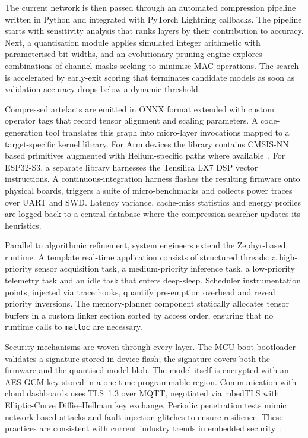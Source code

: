The current network is then passed through an automated compression pipeline written in Python and integrated with PyTorch Lightning callbacks. The pipeline starts with sensitivity analysis that ranks layers by their contribution to accuracy. Next, a quantisation module applies simulated integer arithmetic with parameterised bit-widths, and an evolutionary pruning engine explores combinations of channel masks seeking to minimise MAC operations. The search is accelerated by early-exit scoring that terminates candidate models as soon as validation accuracy drops below a dynamic threshold.

Compressed artefacts are emitted in ONNX format extended with custom operator tags that record tensor alignment and scaling parameters. A code-generation tool translates this graph into micro-layer invocations mapped to a target-specific kernel library. For Arm devices the library contains CMSIS-NN based primitives augmented with Helium-specific paths where available~\cite{arm2023cmsislib}. For ESP32-S3, a separate library harnesses the Tensilica LX7 DSP vector instructions. A continuous-integration harness flashes the resulting firmware onto physical boards, triggers a suite of micro-benchmarks and collects power traces over UART and SWD. Latency variance, cache-miss statistics and energy profiles are logged back to a central database where the compression searcher updates its heuristics.

Parallel to algorithmic refinement, system engineers extend the Zephyr-based runtime. A template real-time application consists of structured threads: a high-priority sensor acquisition task, a medium-priority inference task, a low-priority telemetry task and an idle task that enters deep-sleep. Scheduler instrumentation points, injected via trace hooks, quantify pre-emption overhead and reveal priority inversions. The memory-planner component statically allocates tensor buffers in a custom linker section sorted by access order, ensuring that no runtime calls to \texttt{malloc} are necessary.

Security mechanisms are woven through every layer. The MCU-boot bootloader validates a signature stored in device flash; the signature covers both the firmware and the quantised model blob. The model itself is encrypted with an AES-GCM key stored in a one-time programmable region. Communication with cloud dashboards uses TLS~1.3 over MQTT, negotiated via mbedTLS with Elliptic-Curve Diffie–Hellman key exchange. Periodic penetration tests mimic network-based attacks and fault-injection glitches to ensure resilience. These practices are consistent with current industry trends in embedded security~\cite{embedded2024iotsecurity}.

